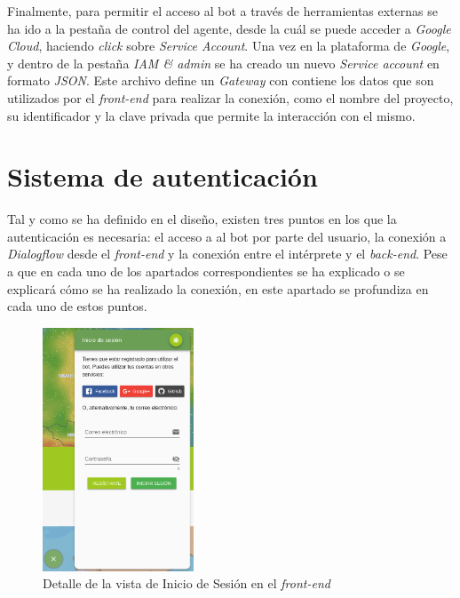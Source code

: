 \documentclass[11pt,spanish,listoffigures]{tfgetsinf}
\begin{document}
Finalmente, para permitir el acceso al bot a través de herramientas externas se ha ido a la pestaña de control del agente, desde la cuál se puede acceder a \textit{Google Cloud}, haciendo \textit{click} sobre \textit{Service Account}. Una vez en la plataforma de \textit{Google}, y dentro de la pestaña \textit{IAM \& admin} se ha creado un nuevo \textit{Service account} en formato \textit{JSON}. Este archivo define un \textit{Gateway} con contiene los datos que son utilizados por el \textit{front-end} para realizar la conexión, como el nombre del proyecto, su identificador y la clave privada que permite la interacción con el mismo. 

\section{Sistema de autenticación}
\label{sec:development-sistema-de-auth}

Tal y como se ha definido en el diseño, existen tres puntos en los que la autenticación es necesaria: el acceso a al bot por parte del usuario, la conexión a \textit{Dialogflow} desde el \textit{front-end} y la conexión entre el intérprete y el \textit{back-end}. Pese a que en cada uno de los apartados correspondientes se ha explicado o se explicará cómo se ha realizado la conexión, en este apartado se profundiza en cada uno de estos puntos.

\begin{figure}[h!]
    \centering
    \includegraphics[width=0.4\textwidth]{images/img13.png}
    \caption{Detalle de la vista de Inicio de Sesión en el \textit{front-end}}
    \label{fig:login}
\end{figure}
\end{document}
